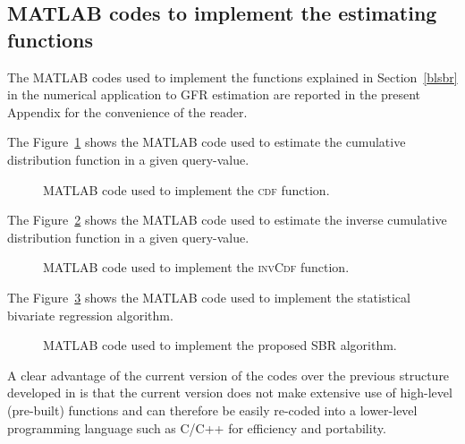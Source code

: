 \documentclass[10pt,final]{siamltex}
\begin{document}
\begin{appendix}
%
\section{MATLAB codes to implement the estimating functions}\label{appa}
% 
The MATLAB codes used to implement the functions explained in Section~\ref{blsbr} in the numerical application to GFR estimation are reported in the present Appendix for the convenience of the reader.

The Figure~\ref{cdf_fun} shows the MATLAB code used to estimate the cumulative distribution function in a given query-value.
%
\begin{figure}[ht]

\caption{MATLAB code used to implement the \textsc{cdf} function.}
\label{cdf_fun}
\end{figure}  
%

The Figure~\ref{invcdf_fun} shows the MATLAB code used to estimate the inverse cumulative distribution function in a given query-value.
%
\begin{figure}[ht]  

\caption{MATLAB code used to implement the \textsc{invCdf} function.}
\label{invcdf_fun}
\end{figure}  
%  

The Figure~\ref{sbr_fun} shows the MATLAB code used to implement the statistical bivariate regression algorithm.
%
\begin{figure}[ht]  

\caption{MATLAB code used to implement the proposed SBR algorithm.}
\label{sbr_fun}
\end{figure}  
%  

A clear advantage of the current version of the codes over the previous structure developed in \cite{fiori} is that the current version does not make extensive use of high-level (pre-built) functions and can therefore be easily re-coded into a lower-level programming language such as C/C++ for efficiency and portability.


\end{appendix}
\end{document}

